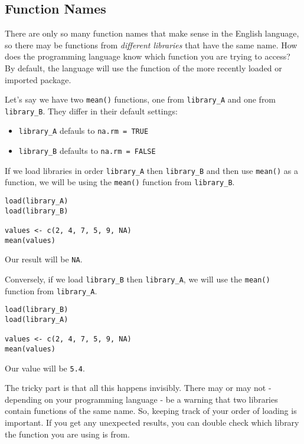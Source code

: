 \documentclass[
]{book}
\providecommand{\tightlist}{%
  \setlength{\itemsep}{0pt}\setlength{\parskip}{0pt}}
\begin{document}
\subsection{Function Names}\label{function-names}

There are only so many function names that make sense in the English language, so there may be functions from \emph{different libraries} that have the same name. How does the programming language know which function you are trying to access? By default, the language will use the function of the more recently loaded or imported package.

Let's say we have two \texttt{mean()} functions, one from \texttt{library\_A} and one from \texttt{library\_B}. They differ in their default settings:

\begin{itemize}
\tightlist
\item
  \texttt{library\_A} defauls to \texttt{na.rm\ =\ TRUE}
\item
  \texttt{library\_B} defaults to \texttt{na.rm\ =\ FALSE}
\end{itemize}

If we load libraries in order \texttt{library\_A} then \texttt{library\_B} and then use \texttt{mean()} as a function, we will be using the \texttt{mean()} function from \texttt{library\_B}.

\begin{verbatim}
load(library_A)
load(library_B)

values <- c(2, 4, 7, 5, 9, NA)
mean(values)
\end{verbatim}

Our result will be \texttt{NA}.

Conversely, if we load \texttt{library\_B} then \texttt{library\_A}, we will use the \texttt{mean()} function from \texttt{library\_A}.

\begin{verbatim}
load(library_B)
load(library_A)

values <- c(2, 4, 7, 5, 9, NA)
mean(values)
\end{verbatim}

Our value will be \texttt{5.4}.

The tricky part is that all this happens invisibly. There may or may not - depending on your programming language - be a warning that two libraries contain functions of the same name. So, keeping track of your order of loading is important. If you get any unexpected results, you can double check which library the function you are using is from.\\
\end{document}
